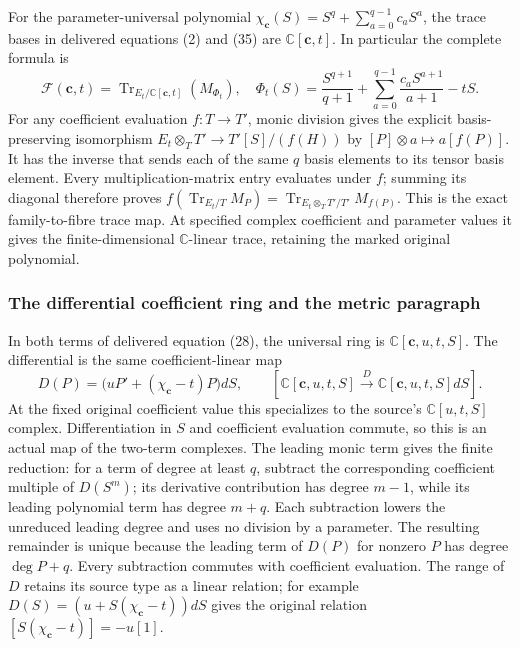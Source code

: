 For the parameter-universal polynomial
$\chi_{\mathbf c}(S)=S^q+\sum_{a=0}^{q-1}c_aS^a$, the trace bases
in delivered equations (2) and (35) are
$\mathbb C[\mathbf c,t]$.  In particular the complete formula is
\[
 \mathcal F(\mathbf c,t)
 =\operatorname{Tr}_{E_t/\mathbb C[\mathbf c,t]}(M_{\Phi_t}),
 \quad
 \Phi_t(S)=\frac{S^{q+1}}{q+1}
       +\sum_{a=0}^{q-1}\frac{c_aS^{a+1}}{a+1}-tS.
 \tag{SGAC5}
\]
For any coefficient evaluation $f:T\to T'$, monic division gives
the explicit basis-preserving isomorphism
$E_t\otimes_TT'\to T'[S]/(f(H))$ by
$[P]\otimes a\mapsto a[f(P)]$.  It has the inverse that sends
each of the same $q$ basis elements to its tensor basis element.
Every multiplication-matrix entry evaluates under $f$; summing its
diagonal therefore proves
$f(\operatorname{Tr}_{E_t/T}M_P)
=\operatorname{Tr}_{E_t\otimes_TT'/T'}M_{f(P)}$.
This is the exact family-to-fibre trace map.  At specified complex
coefficient and parameter values it gives the finite-dimensional
$\mathbb C$-linear trace, retaining the marked original polynomial.

\subsubsection{The differential coefficient ring and the metric paragraph}

In both terms of delivered equation (28), the universal ring is
$\mathbb C[\mathbf c,u,t,S]$.  The differential is the same
coefficient-linear map
\[
 D(P)=\bigl(uP'+(\chi_{\mathbf c}-t)P\bigr)dS,
 \qquad
 [\mathbb C[\mathbf c,u,t,S]\xrightarrow{D}
      \mathbb C[\mathbf c,u,t,S]dS].
 \tag{SGAC6}
\]
At the fixed original coefficient value this specializes to the
source's $\mathbb C[u,t,S]$ complex.  Differentiation in $S$ and
coefficient evaluation commute, so this is an actual map of the
two-term complexes.  The leading monic term gives the finite
reduction: for a term of degree at least $q$, subtract the corresponding
coefficient multiple of $D(S^m)$; its derivative contribution has
degree $m-1$, while its leading polynomial term has degree $m+q$.
Each subtraction lowers the unreduced leading degree and uses no
division by a parameter.  The resulting remainder is unique because
the leading term of $D(P)$ for nonzero $P$ has degree $\deg P+q$.
Every subtraction commutes with coefficient evaluation.  The range
of $D$ retains its source type as a linear relation; for example
$D(S)=(u+S(\chi_{\mathbf c}-t))dS$ gives the original relation
$[S(\chi_{\mathbf c}-t)]=-u[1]$.

